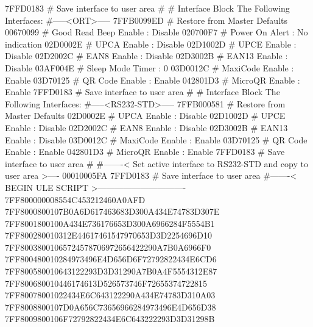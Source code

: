 7FFD0183                       # Save interface to user area
#
# Interface Block The Following Interfaces:
#-----<ORT>-----
7FFB0099ED                     # Restore from Master Defaults
00670099                       # Good Read Beep Enable                    :    Disable
020700F7                       # Power On Alert                           : No indication
02D0002E                       # UPCA Enable                              :    Disable
02D1002D                       # UPCE Enable                              :    Disable
02D2002C                       # EAN8 Enable                              :    Disable
02D3002B                       # EAN13 Enable                             :    Disable
03AF004E                       # Sleep Mode Timer                         :          0
03D0012C                       # MaxiCode Enable                          :     Enable
03D70125                       # QR Code Enable                           :     Enable
042801D3                       # MicroQR Enable                           :     Enable
7FFD0183                       # Save interface to user area
#
# Interface Block The Following Interfaces:
#-----<RS232-STD>-----
7FFB000581                     # Restore from Master Defaults
02D0002E                       # UPCA Enable                              :    Disable
02D1002D                       # UPCE Enable                              :    Disable
02D2002C                       # EAN8 Enable                              :    Disable
02D3002B                       # EAN13 Enable                             :    Disable
03D0012C                       # MaxiCode Enable                          :     Enable
03D70125                       # QR Code Enable                           :     Enable
042801D3                       # MicroQR Enable                           :     Enable
7FFD0183                       # Save interface to user area
#
#-------< Set active interface to RS232-STD and copy to user area >----
00010005FA
7FFD0183                       # Save interface to user area
#-------< BEGIN ULE SCRIPT >-------------------------------
7FF800000008554C453212460A0AFD
7FF8000800107B0A6D617463683D300A434E74783D307E
7FF8001800100A434E736176653D300A6966284F5554B1
7FF800280010312E44617461547970653D3D2254696D10
7FF80038001065724578706972656422290A7B0A6966F0
7FF800480010284973496E4D656D6F72792822434E6CD6
7FF800580010643122293D3D31290A7B0A4F5554312E87
7FF800680010446174613D526573746F72655374722815
7FF80078001022434E6C643122290A434E74783D310A03
7FF8008800107D0A656C73656966284973496E4D656D38
7FF8009800106F72792822434E6C643222293D3D31298B
